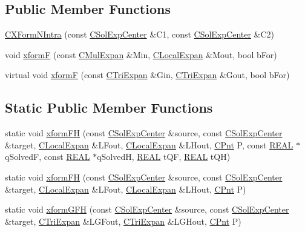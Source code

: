 \subsection*{Public Member Functions}
\begin{DoxyCompactItemize}
\item 
\hyperlink{classCXFormNIntra_ad8a780991043f483b66d1d7ce8a88840}{C\-X\-Form\-N\-Intra} (const \hyperlink{classCSolExpCenter}{C\-Sol\-Exp\-Center} \&C1, const \hyperlink{classCSolExpCenter}{C\-Sol\-Exp\-Center} \&C2)
\item 
void \hyperlink{classCXFormNIntra_a7cb321b0194bfeb01d42b5af7ea82f22}{xform\-F} (const \hyperlink{classCMulExpan}{C\-Mul\-Expan} \&Min, \hyperlink{classCLocalExpan}{C\-Local\-Expan} \&Mout, bool b\-For)
\item 
virtual void \hyperlink{classCXFormNIntra_ac7b9cc9bfee83febbca74f0a1cbf2fef}{xform\-F} (const \hyperlink{classCTriExpan}{C\-Tri\-Expan} \&Gin, \hyperlink{classCTriExpan}{C\-Tri\-Expan} \&Gout, bool b\-For)
\end{DoxyCompactItemize}
\subsection*{Static Public Member Functions}
\begin{DoxyCompactItemize}
\item 
static void \hyperlink{classCXFormNIntra_a94bfabcffcda5ed3b64c046d75ea198a}{xform\-F\-H} (const \hyperlink{classCSolExpCenter}{C\-Sol\-Exp\-Center} \&source, const \hyperlink{classCSolExpCenter}{C\-Sol\-Exp\-Center} \&target, \hyperlink{classCLocalExpan}{C\-Local\-Expan} \&L\-Fout, \hyperlink{classCLocalExpan}{C\-Local\-Expan} \&L\-Hout, \hyperlink{classCPnt}{C\-Pnt} P, const \hyperlink{util_8h_a5821460e95a0800cf9f24c38915cbbde}{R\-E\-A\-L} $\ast$q\-Solved\-F, const \hyperlink{util_8h_a5821460e95a0800cf9f24c38915cbbde}{R\-E\-A\-L} $\ast$q\-Solved\-H, \hyperlink{util_8h_a5821460e95a0800cf9f24c38915cbbde}{R\-E\-A\-L} t\-Q\-F, \hyperlink{util_8h_a5821460e95a0800cf9f24c38915cbbde}{R\-E\-A\-L} t\-Q\-H)
\item 
static void \hyperlink{classCXFormNIntra_a07bfb2f0b7f1da75148b2b5f7b49e797}{xform\-F\-H} (const \hyperlink{classCSolExpCenter}{C\-Sol\-Exp\-Center} \&source, const \hyperlink{classCSolExpCenter}{C\-Sol\-Exp\-Center} \&target, \hyperlink{classCLocalExpan}{C\-Local\-Expan} \&L\-Fout, \hyperlink{classCLocalExpan}{C\-Local\-Expan} \&L\-Hout, \hyperlink{classCPnt}{C\-Pnt} P)
\item 
static void \hyperlink{classCXFormNIntra_a21c51871fbe0d7f378cd819196391eac}{xform\-G\-F\-H} (const \hyperlink{classCSolExpCenter}{C\-Sol\-Exp\-Center} \&source, const \hyperlink{classCSolExpCenter}{C\-Sol\-Exp\-Center} \&target, \hyperlink{classCTriExpan}{C\-Tri\-Expan} \&L\-G\-Fout, \hyperlink{classCTriExpan}{C\-Tri\-Expan} \&L\-G\-Hout, \hyperlink{classCPnt}{C\-Pnt} P)
\end{DoxyCompactItemize}
